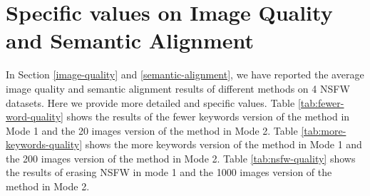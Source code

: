 





\section{Specific values on Image Quality and Semantic Alignment}
\label{quality-on-all-datasets}
In Section \ref{image-quality} and \ref{semantic-alignment}, we have reported the average image quality and semantic alignment results of different methods on 4 NSFW datasets. Here we provide more detailed and specific values. Table \ref{tab:fewer-word-quality} shows the results of the fewer keywords version of the method in Mode 1 and the 20 images version of the method in Mode 2. Table \ref{tab:more-keywords-quality} shows the more keywords version of the method in Mode 1 and the 200 images version of the method in Mode 2. Table \ref{tab:nsfw-quality} shows the results of erasing NSFW in mode 1 and the 1000 images version of the method in Mode 2.







